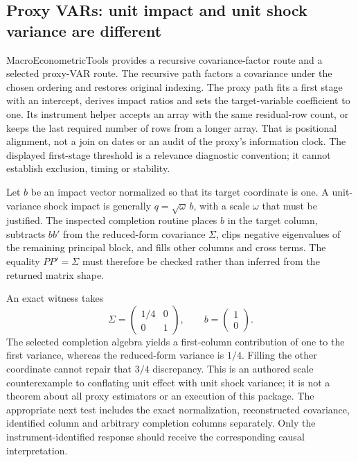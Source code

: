\subsection{Proxy VARs: unit impact and unit shock variance are different}

MacroEconometricTools provides a recursive covariance-factor route and a selected proxy-VAR route. The recursive path factors a covariance under the chosen ordering and restores original indexing. The proxy path fits a first stage with an intercept, derives impact ratios and sets the target-variable coefficient to one. Its instrument helper accepts an array with the same residual-row count, or keeps the last required number of rows from a longer array. That is positional alignment, not a join on dates or an audit of the proxy's information clock. The displayed first-stage threshold is a relevance diagnostic convention; it cannot establish exclusion, timing or stability.\citep{exec25_odyn_macro}

Let $b$ be an impact vector normalized so that its target coordinate is one. A unit-variance shock impact is generally $q=\sqrt{\omega}\,b$, with a scale $\omega$ that must be justified. The inspected completion routine places $b$ in the target column, subtracts $bb'$ from the reduced-form covariance $\Sigma$, clips negative eigenvalues of the remaining principal block, and fills other columns and cross terms. The equality $PP'=\Sigma$ must therefore be checked rather than inferred from the returned matrix shape.\citep{exec25_odyn_macro}

An exact witness takes
\[
 \Sigma=\begin{pmatrix}1/4&0\\0&1\end{pmatrix},\qquad
 b=\begin{pmatrix}1\\0\end{pmatrix}.
\]
The selected completion algebra yields a first-column contribution of one to the first variance, whereas the reduced-form variance is $1/4$. Filling the other coordinate cannot repair that $3/4$ discrepancy. This is an authored scale counterexample to conflating unit effect with unit shock variance; it is not a theorem about all proxy estimators or an execution of this package. The appropriate next test includes the exact normalization, reconstructed covariance, identified column and arbitrary completion columns separately. Only the instrument-identified response should receive the corresponding causal interpretation.\citep{exec25_odyn_macro,exec25_odyn_choice}

